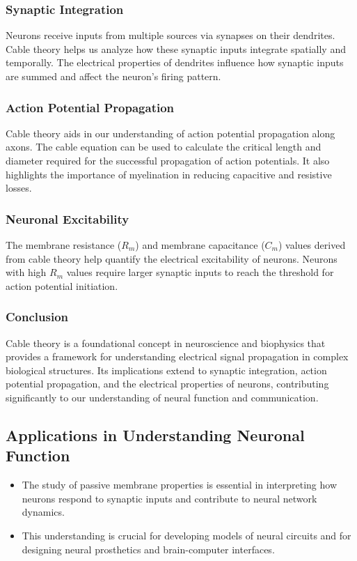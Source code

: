 \documentclass{article}
\begin{document}
\subsubsection{Synaptic Integration}

Neurons receive inputs from multiple sources via synapses on their dendrites. Cable theory helps us analyze how these synaptic inputs integrate spatially and temporally. The electrical properties of dendrites influence how synaptic inputs are summed and affect the neuron's firing pattern.

\subsubsection{Action Potential Propagation}

Cable theory aids in our understanding of action potential propagation along axons. The cable equation can be used to calculate the critical length and diameter required for the successful propagation of action potentials. It also highlights the importance of myelination in reducing capacitive and resistive losses.

\subsubsection{Neuronal Excitability}

The membrane resistance (\(R_m\)) and membrane capacitance (\(C_m\)) values derived from cable theory help quantify the electrical excitability of neurons. Neurons with high \(R_m\) values require larger synaptic inputs to reach the threshold for action potential initiation.

\subsubsection{Conclusion}

Cable theory is a foundational concept in neuroscience and biophysics that provides a framework for understanding electrical signal propagation in complex biological structures. Its implications extend to synaptic integration, action potential propagation, and the electrical properties of neurons, contributing significantly to our understanding of neural function and communication.


\subsection{Applications in Understanding Neuronal Function}
\begin{itemize}
    \item The study of passive membrane properties is essential in interpreting how neurons respond to synaptic inputs and contribute to neural network dynamics.
    \item This understanding is crucial for developing models of neural circuits and for designing neural prosthetics and brain-computer interfaces.
\end{itemize}
\end{document}
